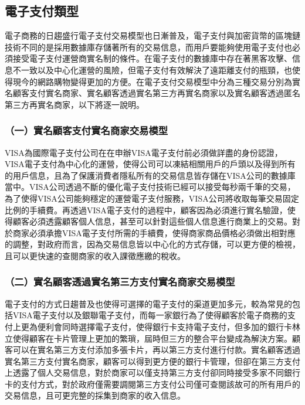 	\subsection{電子支付類型}
	電子商務的日趨盛行電子支付交易模型也日漸普及，電子支付與加密貨幣的區塊鏈技術不同的是採用數據庫存儲著所有的交易信息，而用戶要能夠使用電子支付也必須接受電子支付運營商實名制的條件。在電子支付的數據庫中存在著黑客攻擊、信息不一致以及中心化運營的風險，但電子支付有效解決了遠距離支付的瓶頸，也使得現今的網路購物變得更加的方便。在電子支付交易模型中分為三種交易分別為實名顧客支付實名商家、實名顧客透過實名第三方再實名商家以及實名顧客透過匿名第三方再實名商家，以下將逐一說明。

		\subsubsection{（一）實名顧客支付實名商家交易模型}
		VISA為國際電子支付公司在在申辦VISA電子支付前必須做詳盡的身份認證，VISA電子支付為中心化的運營，使得公司可以凍結相關用戶的戶頭以及得到所有的用戶信息，且為了保護消費者隱私所有的交易信息皆存儲在VISA公司的數據庫當中。VISA公司透過不斷的優化電子支付技術已經可以接受每秒兩千筆的交易，為了使得VISA公司能夠穩定的運營電子支付服務，VISA公司將收取每筆交易固定比例的手續費。再透過VISA電子支付的過程中，顧客因為必須進行實名驗證，使得顧客必須透露顧客個人信息，甚至可以針對這些個人信息進行商業上的交易。對於商家必須承擔VISA電子支付所需的手續費，使得商家商品價格必須做出相對應的調整，對政府而言，因為交易信息皆以中心化的方式存儲，可以更方便的檢視，且可以更快速的查閱商家的收入課徵應繳的稅收。
		

		\subsubsection{（二）實名顧客透過實名第三方支付實名商家交易模型}
		電子支付的方式日趨普及也使得可選擇的電子支付的渠道更加多元，較為常見的包括VISA電子支付以及銀聯電子支付，而每一家銀行為了使得顧客於電子商務的支付上更為便利會同時選擇電子支付，使得銀行卡支持電子支付，但多加的銀行卡林立使得顧客在卡片管理上更加的繁瑣，屆時但三方的整合平台變成為解決方案。顧客可以在實名第三方支付添加多張卡片，再以第三方支付進行付款。實名顧客透過實名第三方支付實名商家，顧客可以得到更方便的銀行卡管理，但卻在第三方支付上透露了個人交易信息，對於商家可以僅支持第三方支付卻同時接受多家不同銀行卡的支付方式，對於政府僅需要調閱第三方支付公司僅可查閱該故可的所有用戶的交易信息，且可更完整的採集到商家的收入信息。
		
